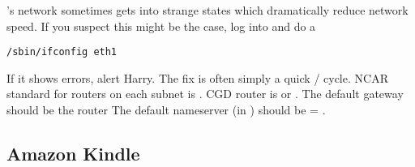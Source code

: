 \documentclass[12pt,twoside]{article}
\begin{document}
's network sometimes gets into strange states which
dramatically reduce network speed.
If you suspect this might be the case, log into  and do a
\begin{verbatim}
/sbin/ifconfig eth1
\end{verbatim}
If it shows errors, alert Harry.
The fix is often simply a quick / cycle.
NCAR standard for routers on each subnet is .
CGD router is  or .
The default gateway should be the router
The default nameserver (in ) should be
 = . 

\subsection{Amazon Kindle}\label{sxn:knd}
\end{document}
